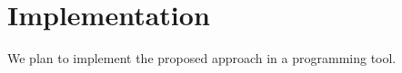 
\section{Implementation}
\label{sec:implementation}

We plan to implement the proposed approach in a programming
tool.

